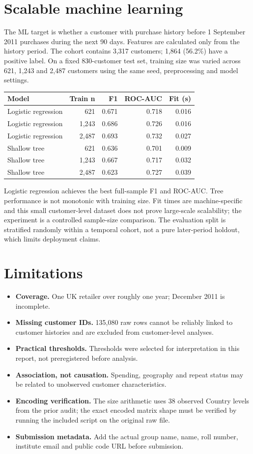 \documentclass[10pt,a4paper,twocolumn]{article}
\begin{document}
\section{Scalable machine learning}
The ML target is whether a customer with purchase history before 1 September 2011 purchases during the next 90 days. Features are calculated only from the history period. The cohort contains 3,317 customers; 1,864 (56.2\%) have a positive label. On a fixed 830-customer test set, training size was varied across 621, 1,243 and 2,487 customers using the same seed, preprocessing and model settings.
{\footnotesize
\begin{tabularx}{\linewidth}{@{}L{2.7cm} r r r r@{}}
\toprule
\textbf{Model} & \textbf{Train n} & \textbf{F1} & \textbf{ROC-AUC} & \textbf{Fit (s)}\\
\midrule
Logistic regression & 621 & 0.671 & 0.718 & 0.016\\
Logistic regression & 1,243 & 0.686 & 0.726 & 0.016\\
Logistic regression & 2,487 & 0.693 & 0.732 & 0.027\\
Shallow tree & 621 & 0.636 & 0.701 & 0.009\\
Shallow tree & 1,243 & 0.667 & 0.717 & 0.032\\
Shallow tree & 2,487 & 0.623 & 0.727 & 0.039\\
\bottomrule
\end{tabularx}}
Logistic regression achieves the best full-sample F1 and ROC-AUC. Tree performance is not monotonic with training size. Fit times are machine-specific and this small customer-level dataset does not prove large-scale scalability; the experiment is a controlled sample-size comparison. The evaluation split is stratified randomly within a temporal cohort, not a pure later-period holdout, which limits deployment claims.
\section{Limitations}
\begin{itemize}
\item \textbf{Coverage.} One UK retailer over roughly one year; December 2011 is incomplete.
\item \textbf{Missing customer IDs.} 135,080 raw rows cannot be reliably linked to customer histories and are excluded from customer-level analyses.
\item \textbf{Practical thresholds.} Thresholds were selected for interpretation in this report, not preregistered before analysis.
\item \textbf{Association, not causation.} Spending, geography and repeat status may be related to unobserved customer characteristics.
\item \textbf{Encoding verification.} The size arithmetic uses 38 observed Country levels from the prior audit; the exact encoded matrix shape must be verified by running the included script on the original raw file.
\item \textbf{Submission metadata.} Add the actual group name, name, roll number, institute email and public code URL before submission.
\end{itemize}
\end{document}
